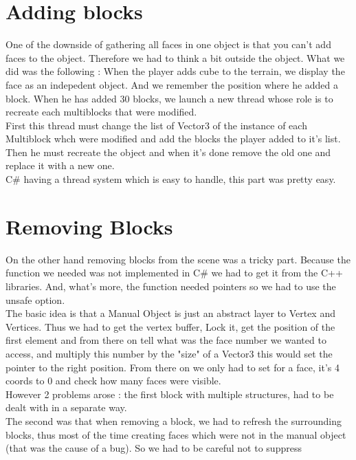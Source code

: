\documentclass[article]{report} %
\begin{document}
			\section{Adding blocks}
				One of the downside of gathering all faces in one object is that you can't add faces to the object. Therefore we had to think a bit outside the object. What we did was the following : When the player adds cube to the terrain, we display the face as an indepedent object. And  we remember the position where he added a block. When he has added 30 blocks, we launch a new thread whose role is to recreate each multiblocks that were modified.\\

				First this thread must change the list of Vector3 of the instance of each Multiblock whch were modified and add the blocks the player added to it's list. Then he must recreate the object and when it's done remove the old one and replace it with a new one.\\

				C\# having a thread system which is easy to handle, this part was pretty easy.
				
			\section{Removing Blocks}
				On the other hand removing blocks from the scene was a tricky part. Because the function we needed was not implemented in C\# we had to get it from the C++ libraries. And, what's more, the function needed pointers so we had to use the unsafe option.\\
The basic idea is that a Manual Object is just an abstract layer to Vertex and Vertices. Thus we had to get the vertex buffer, Lock it, get the position of the first element and from there on tell what was the face number we wanted to access, and multiply this number by the "size" of a Vector3 this would set the pointer to the right position. From there on we only had to set for a face, it's 4 coords to 0 and check how many faces were visible.\\

However 2 problems arose : the first block with multiple structures, had to be dealt with in a separate way. \\
The second was that when removing a block, we had to refresh the surrounding blocks, thus most of the time creating faces which were not in the manual object (that was the cause of a bug). So we had to be careful not to suppress 
\end{document}
